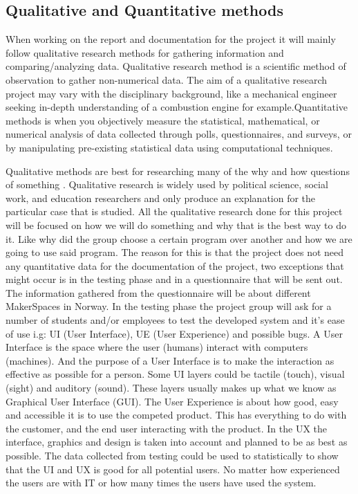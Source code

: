 \subsection{Qualitative and Quantitative methods} When working on the report and documentation for the project it will mainly follow qualitative research methods for gathering information and comparing/analyzing data. Qualitative research method is a scientific method of observation to gather non-numerical data. The aim of a qualitative research project may vary with the disciplinary background, like a mechanical engineer seeking in-depth understanding of a combustion engine for example\cite{Qualitative-Research}.Quantitative methods is when you objectively measure the statistical, mathematical, or numerical analysis of data collected through polls, questionnaires, and surveys, or by manipulating pre-existing statistical data using computational techniques\cite{Quantitative_Methods}.   
 
 Qualitative methods are best for researching many of the why and how questions of something \cite{Qualitative-Research}. Qualitative research is widely used by political science, social work, and education researchers and only produce an explanation for the particular case that is studied. All the qualitative research done for this project will be focused on how we will do something and why that is the best way to do it. Like why did the group choose a certain program over another and how we are going to use said program. The reason for this is that the project does not need any quantitative data for the documentation of the project, two exceptions that might occur is in the testing phase and in a questionnaire that will be sent out. The information gathered from the questionnaire will be about different MakerSpaces in Norway. In the testing phase the project group will ask for a number of students and/or employees to test the developed system and it's ease of use i.g: UI (User Interface), UE (User Experience) and possible bugs. A User Interface is the space where the user (humans) interact with computers (machines)\cite{user-interface}. And the purpose of a User Interface is to make the interaction as effective as possible for a person. Some UI layers could be tactile (touch), visual (sight) and auditory (sound). These layers usually makes up what we know as Graphical User Interface (GUI)\cite{GUI}. The User Experience is about how good, easy and accessible it is to use the competed product. This has everything to do with the customer, and the end user interacting with the product. In the UX the interface, graphics and design is taken into account and planned to be as best as possible\cite{UX}.  
 The data collected from testing could be used to statistically to show that the UI and UX is good for all potential users. No matter how experienced the users are with IT or how many times the users have used the system.
